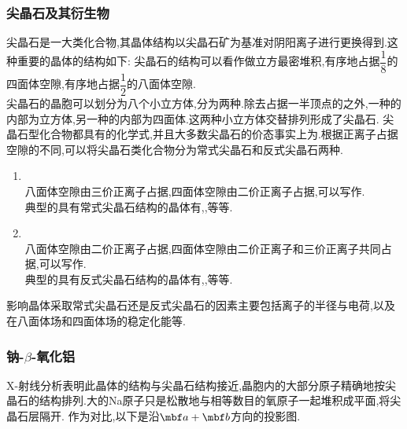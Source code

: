 \documentclass{ctexart}
\begin{document}
\subsubsection{尖晶石及其衍生物}
尖晶石是一大类化合物,其晶体结构以尖晶石矿为基准对阴阳离子进行更换得到.这种重要的晶体的结构如下:
尖晶石的结构可以看作做立方最密堆积,有序地占据$\dfrac18$的四面体空隙,有序地占据$\dfrac12$的八面体空隙.\\
\indent 尖晶石的晶胞可以划分为八个小立方体,分为两种.除去占据一半顶点的之外,一种的内部为立方体,另一种的内部为四面体.这两种小立方体交替排列形成了尖晶石.
尖晶石型化合物都具有的化学式,并且大多数尖晶石的价态事实上为.根据正离子占据空隙的不同,可以将尖晶石类化合物分为常式尖晶石和反式尖晶石两种.
\begin{enumerate}[label=\tbf{\arabic*.},topsep=0pt,parsep=0pt,itemsep=0pt,partopsep=0pt]
    \item {}\\
        八面体空隙由三价正离子占据,四面体空隙由二价正离子占据,可以写作.\\
        典型的具有常式尖晶石结构的晶体有,,等等.
    \item {}\\
        八面体空隙由二价正离子占据,四面体空隙由二价正离子和三价正离子共同占据,可以写作.\\
        典型的具有反式尖晶石结构的晶体有,,等等.
\end{enumerate}
\indent 影响晶体采取常式尖晶石还是反式尖晶石的因素主要包括离子的半径与电荷,以及在八面体场和四面体场的稳定化能等.
\subsubsection{钠-$\beta$-氧化铝}
X-射线分析表明此晶体的结构与尖晶石结构接近,晶胞内的大部分原子精确地按尖晶石的结构排列.大的Na原子只是松散地与相等数目的氧原子一起堆积成平面,将尖晶石层隔开.
作为对比,以下是沿$\mbf a+\mbf b$方向的投影图.
\end{document}
